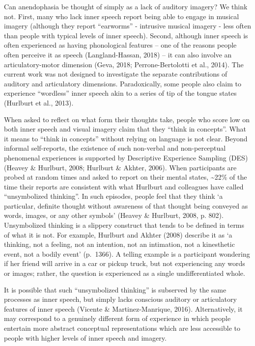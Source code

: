 \documentclass[
  man,a4paper,floatsintext]{apa6}
\begin{document}
Can anendophasia be thought of simply as a lack of auditory imagery? We think not. First, many who lack inner speech report being able to engage in musical imagery (although they report ``earworms'' - intrusive musical imagery - less often than people with typical levels of inner speech). Second, although inner speech is often experienced as having phonological features -- one of the reasons people often perceive it as speech (Langland-Hassan, 2018) -- it can also involve an articulatory-motor dimension (Geva, 2018; Perrone-Bertolotti et al., 2014). The current work was not designed to investigate the separate contributions of auditory and articulatory dimensions. Paradoxically, some people also claim to experience ``wordless'' inner speech akin to a series of tip of the tongue states (Hurlburt et al., 2013).

When asked to reflect on what form their thoughts take, people who score low on both inner speech and visual imagery claim that they ``think in concepts''. What it means to ``think in concepts'' without relying on language is not clear. Beyond informal self-reports, the existence of such non-verbal and non-perceptual phenomenal experiences is supported by Descriptive Experience Sampling (DES) (Heavey \& Hurlburt, 2008; Hurlburt \& Akhter, 2006). When participants are probed at random times and asked to report on their mental states, \textasciitilde22\% of the time their reports are consistent with what Hurlburt and colleagues have called ``unsymbolized thinking''. In such episodes, people feel that they think `a particular, definite thought without awareness of that thought being conveyed as words, images, or any other symbols' (Heavey \& Hurlburt, 2008, p. 802). Unsymbolized thinking is a slippery construct that tends to be defined in terms of what it is not. For example, Hurlburt and Akhter (2008) describe it as `a thinking, not a feeling, not an intention, not an intimation, not a kinesthetic event, not a bodily event' (p.~1366). A telling example is a participant wondering if her friend will arrive in a car or pickup truck, but not experiencing any words or images; rather, the question is experienced as a single undifferentiated whole.

It is possible that such ``unsymbolized thinking'' is subserved by the same processes as inner speech, but simply lacks conscious auditory or articulatory features of inner speech (Vicente \& Martinez-Manrique, 2016). Alternatively, it may correspond to a genuinely different form of experience in which people entertain more abstract conceptual representations which are less accessible to people with higher levels of inner speech and imagery.
\end{document}
